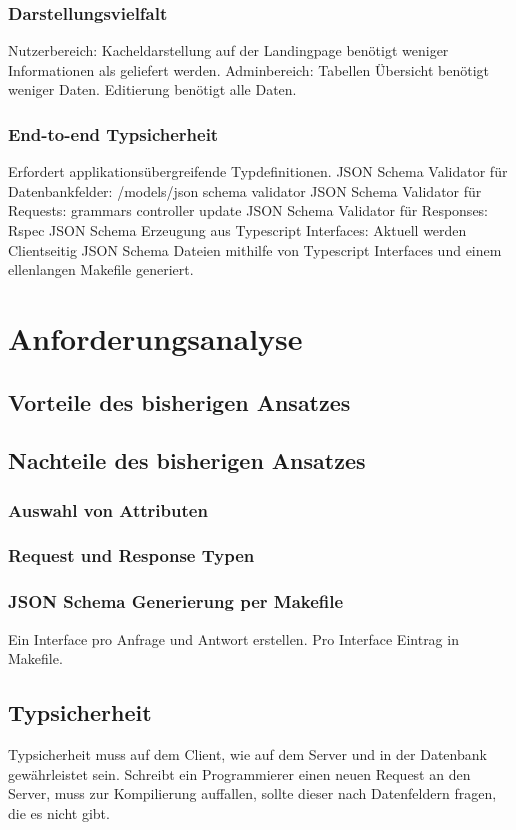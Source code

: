 \subsection{Darstellungsvielfalt}
Nutzerbereich:
Kacheldarstellung auf der Landingpage benötigt weniger Informationen als geliefert werden.
Adminbereich:
Tabellen Übersicht benötigt weniger Daten. Editierung benötigt alle Daten.

\subsection{End-to-end Typsicherheit}
Erfordert applikationsübergreifende Typdefinitionen. 
JSON Schema Validator für Datenbankfelder:
/models/json schema validator
JSON Schema Validator für Requests:
grammars controller update
JSON Schema Validator für Responses:
Rspec
JSON Schema Erzeugung aus Typescript Interfaces:
Aktuell werden Clientseitig JSON Schema Dateien mithilfe von Typescript Interfaces und einem ellenlangen Makefile generiert.


\chapter{Anforderungsanalyse}
\section{Vorteile des bisherigen Ansatzes}
\section{Nachteile des bisherigen Ansatzes}
\subsection{Auswahl von Attributen}
\subsection{Request und Response Typen}
\subsection{JSON Schema Generierung per Makefile}
Ein Interface pro Anfrage und Antwort erstellen. Pro Interface Eintrag in Makefile.

\section{Typsicherheit}
Typsicherheit muss auf dem Client, wie auf dem Server und in der Datenbank gewährleistet sein. Schreibt ein Programmierer einen neuen Request an den Server,
muss zur Kompilierung auffallen, sollte dieser nach Datenfeldern fragen, die es nicht gibt.

